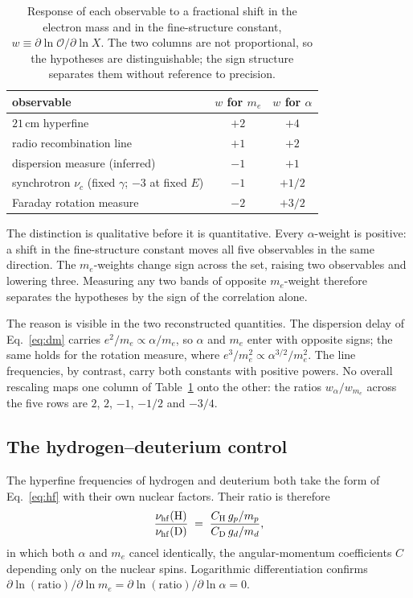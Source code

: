 \documentclass[aps,prd,twocolumn,superscriptaddress,nofootinbib,10pt]{revtex4-2}
\begin{document}
\begin{table}[t]
\caption{Response of each observable to a fractional shift in the electron mass and in the
fine-structure constant, $w \equiv \partial \ln \mathcal{O} / \partial \ln X$. The two columns are
not proportional, so the hypotheses are distinguishable; the sign structure separates them without
reference to precision.}
\label{tab:weights}
\begin{ruledtabular}
\begin{tabular}{lcc}
observable & $w$ for $m_e$ & $w$ for $\alpha$ \\
\hline
$21\,$cm hyperfine          & $+2$ & $+4$   \\
radio recombination line    & $+1$ & $+2$   \\
dispersion measure (inferred) & $-1$ & $+1$   \\
synchrotron $\nu_c$ (fixed $\gamma$; $-3$ at fixed $E$) & $-1$ & $+1/2$ \\
Faraday rotation measure    & $-2$ & $+3/2$ \\
\end{tabular}
\end{ruledtabular}
\end{table}

The distinction is qualitative before it is quantitative. Every $\alpha$-weight is positive: a
shift in the fine-structure constant moves all five observables in the same direction. The
$m_e$-weights change sign across the set, raising two observables and lowering three. Measuring any
two bands of opposite $m_e$-weight therefore separates the hypotheses by the sign of the
correlation alone.

The reason is visible in the two reconstructed quantities. The dispersion delay of
Eq.~\eqref{eq:dm} carries $e^{2}/m_e \propto \alpha/m_e$, so $\alpha$ and $m_e$ enter with opposite
signs; the same holds for the rotation measure, where $e^{3}/m_e^{2} \propto \alpha^{3/2}/m_e^{2}$.
The line frequencies, by contrast, carry both constants with positive powers. No overall rescaling
maps one column of Table~\ref{tab:weights} onto the other: the ratios $w_\alpha / w_{m_e}$ across
the five rows are $2$, $2$, $-1$, $-1/2$ and $-3/4$.

\subsection{The hydrogen--deuterium control}

The hyperfine frequencies of hydrogen and deuterium both take the form of Eq.~\eqref{eq:hf} with
their own nuclear factors. Their ratio is therefore
%
\begin{equation}
  \frac{\nu_{\rm hf}({\rm H})}{\nu_{\rm hf}({\rm D})}
  \;=\; \frac{C_{\rm H}\, g_p / m_p}{C_{\rm D}\, g_d / m_d},
\end{equation}
%
in which both $\alpha$ and $m_e$ cancel identically, the angular-momentum coefficients $C$
depending only on the nuclear spins. Logarithmic differentiation confirms
$\partial \ln(\text{ratio})/\partial \ln m_e = \partial \ln(\text{ratio})/\partial \ln \alpha = 0$.
\end{document}
